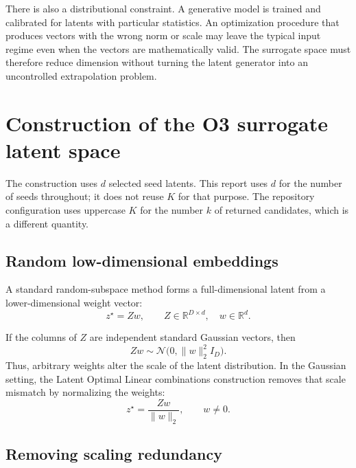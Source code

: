 \documentclass[11pt]{article}
\newcommand{\R}{\mathbb{R}}
\newcommand{\norm}[1]{\lVert #1 \rVert_2}
\begin{document}
There is also a distributional constraint.  A generative model is trained and
calibrated for latents with particular statistics.  An optimization procedure
that produces vectors with the wrong norm or scale may leave the typical input
regime even when the vectors are mathematically valid.  The surrogate space
must therefore reduce dimension without turning the latent generator into an
uncontrolled extrapolation problem.

\section{Construction of the O3 surrogate latent space}
\label{sec:construction}

The construction uses \(d\) selected seed latents.  This report uses \(d\) for
the number of seeds throughout; it does not reuse \(K\) for that purpose.  The
repository configuration uses uppercase \(K\) for the number \(k\) of
returned candidates, which is a different quantity.

\subsection{Random low-dimensional embeddings}

A standard random-subspace method forms a full-dimensional latent from a
lower-dimensional weight vector:
\begin{equation}
    z^\star=Zw,
    \qquad Z\in\R^{D\times d},\quad w\in\R^d.
    \label{eq:random-embedding}
\end{equation}

If the columns of \(Z\) are independent standard Gaussian vectors, then
\begin{equation}
    Zw\sim\mathcal{N}\bigl(0,\norm{w}^2 I_D\bigr).
    \label{eq:embedding-scale}
\end{equation}
Thus, arbitrary weights alter the scale of the latent distribution.  In the
Gaussian setting, the Latent Optimal Linear combinations construction removes
that scale mismatch by normalizing the weights:
\begin{equation}
    z^\star=\frac{Zw}{\norm{w}},
    \qquad w\ne 0.
    \label{eq:lol-normalization}
\end{equation}

\subsection{Removing scaling redundancy}
\end{document}
